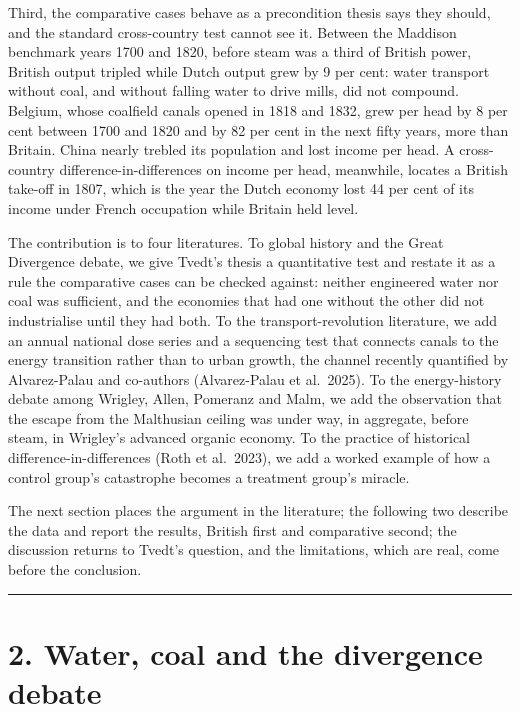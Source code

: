 \documentclass[
  11pt,
]{article}
\begin{document}
Third, the comparative cases behave as a precondition thesis says they
should, and the standard cross-country test cannot see it. Between the
Maddison benchmark years 1700 and 1820, before steam was a third of
British power, British output tripled while Dutch output grew by 9 per
cent: water transport without coal, and without falling water to drive
mills, did not compound. Belgium, whose coalfield canals opened in 1818
and 1832, grew per head by 8 per cent between 1700 and 1820 and by 82
per cent in the next fifty years, more than Britain. China nearly
trebled its population and lost income per head. A cross-country
difference-in-differences on income per head, meanwhile, locates a
British take-off in 1807, which is the year the Dutch economy lost 44
per cent of its income under French occupation while Britain held level.

The contribution is to four literatures. To global history and the Great
Divergence debate, we give Tvedt's thesis a quantitative test and
restate it as a rule the comparative cases can be checked against:
neither engineered water nor coal was sufficient, and the economies that
had one without the other did not industrialise until they had both. To
the transport-revolution literature, we add an annual national dose
series and a sequencing test that connects canals to the energy
transition rather than to urban growth, the channel recently quantified
by Alvarez-Palau and co-authors (Alvarez-Palau et al.~2025). To the
energy-history debate among Wrigley, Allen, Pomeranz and Malm, we add
the observation that the escape from the Malthusian ceiling was under
way, in aggregate, before steam, in Wrigley's advanced organic economy.
To the practice of historical difference-in-differences (Roth et
al.~2023), we add a worked example of how a control group's catastrophe
becomes a treatment group's miracle.

The next section places the argument in the literature; the following
two describe the data and report the results, British first and
comparative second; the discussion returns to Tvedt's question, and the
limitations, which are real, come before the conclusion.

\begin{center}\rule{0.5\linewidth}{0.5pt}\end{center}

\section{2. Water, coal and the divergence
debate}\label{water-coal-and-the-divergence-debate}
\end{document}
